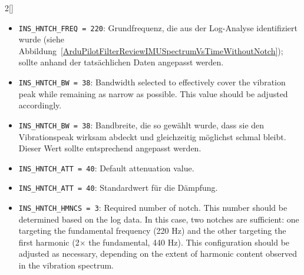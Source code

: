 \begin{paracol}{2}[]
\colger

\begin{itemize}
\item \texttt{INS\_HNTCH\_FREQ = 220}: Grundfrequenz, die aus der Log-Analyse identifiziert wurde (siehe Abbildung~\ref{ArduPilotFilterReviewIMUSpectrumVsTimeWithoutNotch}); sollte anhand der tatsächlichen Daten angepasst werden.
\end{itemize}

\coleng

\begin{itemize}
\item \texttt{INS\_HNTCH\_BW = 38}: Bandwidth selected to effectively cover the vibration peak while remaining as narrow as possible. This value should be adjusted accordingly.
\end{itemize}

\colger

\begin{itemize}
\item \texttt{INS\_HNTCH\_BW = 38}: Bandbreite, die so gewählt wurde, dass sie den Vibrationspeak wirksam abdeckt und gleichzeitig möglichst schmal bleibt. Dieser Wert sollte entsprechend angepasst werden.
\end{itemize}

\coleng

\begin{itemize}
\item \texttt{INS\_HNTCH\_ATT = 40}: Default attenuation value.
\end{itemize}

\colger

\begin{itemize}
\item \texttt{INS\_HNTCH\_ATT = 40}: Standardwert für die Dämpfung.
\end{itemize}

\coleng

\begin{itemize}
\item \texttt{INS\_HNTCH\_HMNCS = 3}: Required number of notch. This number should be determined based on the log data. In this case, two notches are sufficient: one targeting the fundamental frequency (220 Hz) and the other targeting the first harmonic (2× the fundamental, 440 Hz). This configuration should be adjusted as necessary, depending on the extent of harmonic content observed in the vibration spectrum.
\end{itemize}


\end{paracol}

